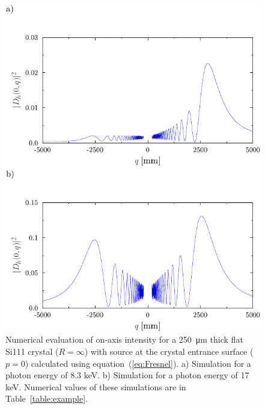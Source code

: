 \documentclass[preprint]{iucr}              %
\newcommand{\todo}[1]{{\color{red}[TODO: "#1'']}}
\begin{document}
\begin{figure}
\label{fig:flatLaue}
\caption{Numerical evaluation of on-axis intensity for a  \SI{250}{\micro\meter} thick flat Si111 crystal ($R=\infty$) with source at the crystal entrance surface ($p=0$) calculated using equation~(\ref{eq:Fresnel}).
a) Simulation for a photon energy of 8.3 keV.
b) Simulation for a photon energy of 17 keV.
Numerical values of these simulations are in Table~\ref{table:example}.
}
\includegraphics[width=1\textwidth]{fig4.pdf}
\end{figure}

\end{document}
